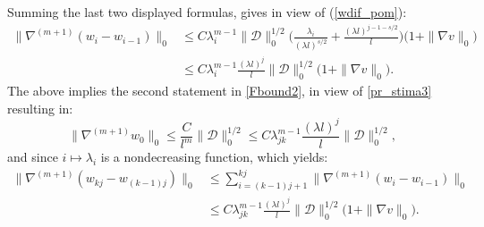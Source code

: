 \documentclass[reqno,twoside,11pt]{amsart}
\numberwithin{equation}{section}
\theoremstyle{plain}
\theoremstyle{definition}
\begin{document}
Summing the last two displayed formulas, gives in view of  (\ref{wdif_pom}):
\begin{equation*}
\begin{split}
\|\nabla^{(m+1)}(w_i-w_{i-1})\|_0  & \leq C\lambda_i^{m-1}\|\mathcal{D}\|_0^{1/2}
\Big(\frac{\lambda_i}{(\lambda l)^{s/2}} + \frac{(\lambda l)^{j-1-s/2}}{l}\Big)
\big(1+\|\nabla v\|_0\big) \\ & \leq  C\lambda_i^{m-1}\frac{(\lambda l)^j}{l}\|\mathcal{D}\|_0^{1/2}
\big(1+\|\nabla v\|_0\big).  
\end{split}
\end{equation*}
The above implies the second statement in \ref{Fbound2}, in view of \ref{pr_stima3} resulting in: 
$$\|\nabla^{(m+1)}w_0\|_0 \leq \frac{C}{l^m}\|\mathcal{D}\|_0^{1/2} \leq
C\lambda_{jk}^{m-1}\frac{(\lambda l)^j}{l}  \|\mathcal{D}\|_0^{1/2},$$
and since $i\mapsto \lambda_i$ is a nondecreasing function, which yields:
\begin{equation*}
\begin{split}
\|\nabla^{(m+1)}(w_{kj} - w_{(k-1)j})\|_0 & \leq \sum_{i=(k-1)j+1}^{kj}\|\nabla^{(m+1)}(w_i-w_{i-1})\|_0
\\ & \leq C\lambda_{jk}^{m-1}\frac{(\lambda l)^j}{l} \|\mathcal{D}\|_0^{1/2}\big(1+\|\nabla v\|_0\big).
\end{split}
\end{equation*}

\medskip
\end{document}

